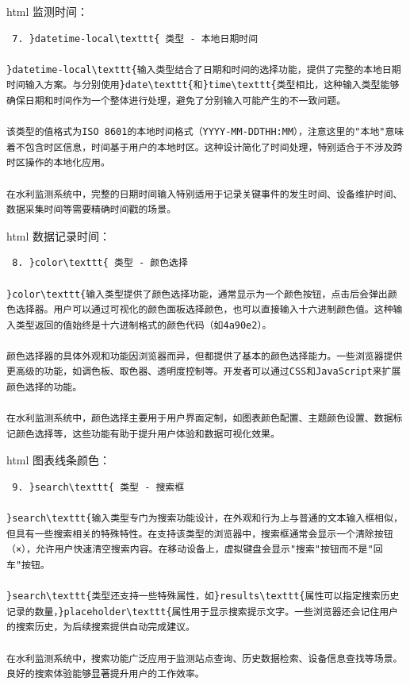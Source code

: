 html 监测时间：

\begin{lstlisting}
 7. }datetime-local\texttt{ 类型 - 本地日期时间

}datetime-local\texttt{输入类型结合了日期和时间的选择功能，提供了完整的本地日期时间输入方案。与分别使用}date\texttt{和}time\texttt{类型相比，这种输入类型能够确保日期和时间作为一个整体进行处理，避免了分别输入可能产生的不一致问题。

该类型的值格式为ISO 8601的本地时间格式（YYYY-MM-DDTHH:MM），注意这里的"本地"意味着不包含时区信息，时间基于用户的本地时区。这种设计简化了时间处理，特别适合于不涉及跨时区操作的本地化应用。

在水利监测系统中，完整的日期时间输入特别适用于记录关键事件的发生时间、设备维护时间、数据采集时间等需要精确时间戳的场景。
\end{lstlisting}

html 数据记录时间：

\begin{lstlisting}
 8. }color\texttt{ 类型 - 颜色选择

}color\texttt{输入类型提供了颜色选择功能，通常显示为一个颜色按钮，点击后会弹出颜色选择器。用户可以通过可视化的颜色面板选择颜色，也可以直接输入十六进制颜色值。这种输入类型返回的值始终是十六进制格式的颜色代码（如4a90e2）。

颜色选择器的具体外观和功能因浏览器而异，但都提供了基本的颜色选择能力。一些浏览器提供更高级的功能，如调色板、取色器、透明度控制等。开发者可以通过CSS和JavaScript来扩展颜色选择的功能。

在水利监测系统中，颜色选择主要用于用户界面定制，如图表颜色配置、主题颜色设置、数据标记颜色选择等，这些功能有助于提升用户体验和数据可视化效果。
\end{lstlisting}

html 图表线条颜色：

\begin{lstlisting}
 9. }search\texttt{ 类型 - 搜索框

}search\texttt{输入类型专门为搜索功能设计，在外观和行为上与普通的文本输入框相似，但具有一些搜索相关的特殊特性。在支持该类型的浏览器中，搜索框通常会显示一个清除按钮（×），允许用户快速清空搜索内容。在移动设备上，虚拟键盘会显示"搜索"按钮而不是"回车"按钮。

}search\texttt{类型还支持一些特殊属性，如}results\texttt{属性可以指定搜索历史记录的数量，}placeholder\texttt{属性用于显示搜索提示文字。一些浏览器还会记住用户的搜索历史，为后续搜索提供自动完成建议。

在水利监测系统中，搜索功能广泛应用于监测站点查询、历史数据检索、设备信息查找等场景。良好的搜索体验能够显著提升用户的工作效率。
\end{lstlisting}

